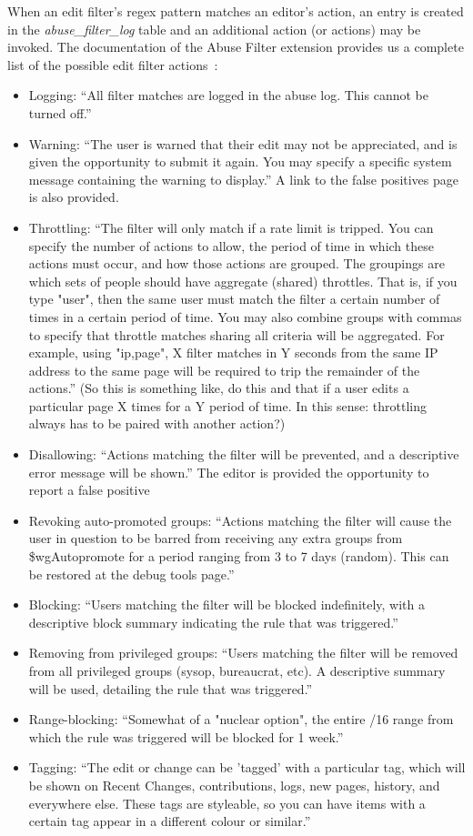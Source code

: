 \documentclass{sigchi}
\begin{document}
When an edit filter's regex pattern matches an editor's action, an entry is created in the \emph{abuse\_filter\_log} table and an additional action (or actions) may be invoked.
The documentation of the Abuse Filter extension provides us a complete list of the possible edit filter actions~\cite{Mediawiki:AbuseFilterActions}:
\begin{itemize}
    \item Logging: ``All filter matches are logged in the abuse log. This cannot be turned off.''
    \item Warning: ``The user is warned that their edit may not be appreciated, and is given the opportunity to submit it again. You may specify a specific system message containing the warning to display.'' A link to the false positives page~\cite{Wikipedia:EditFilterFalsePositives} is also provided.
    \item Throttling: ``The filter will only match if a rate limit is tripped. You can specify the number of actions to allow, the period of time in which these actions must occur, and how those actions are grouped.
         The groupings are which sets of people should have aggregate (shared) throttles. That is, if you type "user", then the same user must match the filter a certain number of times in a certain period of time. You may also combine groups with commas to specify that throttle matches sharing all criteria will be aggregated. For example, using "ip,page", X filter matches in Y seconds from the same IP address to the same page will be required to trip the remainder of the actions.''
         (So this is something like, do this and that if a user edits a particular page X times for a Y period of time. In this sense: throttling always has to be paired with another action?)
    \item Disallowing: ``Actions matching the filter will be prevented, and a descriptive error message will be shown.'' The editor is provided the opportunity to report a false positive
    \item Revoking auto-promoted groups: ``Actions matching the filter will cause the user in question to be barred from receiving any extra groups from \$wgAutopromote for a period ranging from 3 to 7 days (random). This can be restored at the debug tools page.''
    \item Blocking: ``Users matching the filter will be blocked indefinitely, with a descriptive block summary indicating the rule that was triggered.''
    \item Removing from privileged groups: ``Users matching the filter will be removed from all privileged groups (sysop, bureaucrat, etc). A descriptive summary will be used, detailing the rule that was triggered.''
    \item Range-blocking: ``Somewhat of a "nuclear option", the entire /16 range from which the rule was triggered will be blocked for 1 week.''
    \item Tagging: ``The edit or change can be 'tagged' with a particular tag, which will be shown on Recent Changes, contributions, logs, new pages, history, and everywhere else. These tags are styleable, so you can have items with a certain tag appear in a different colour or similar.''
\end{itemize}
\end{document}
